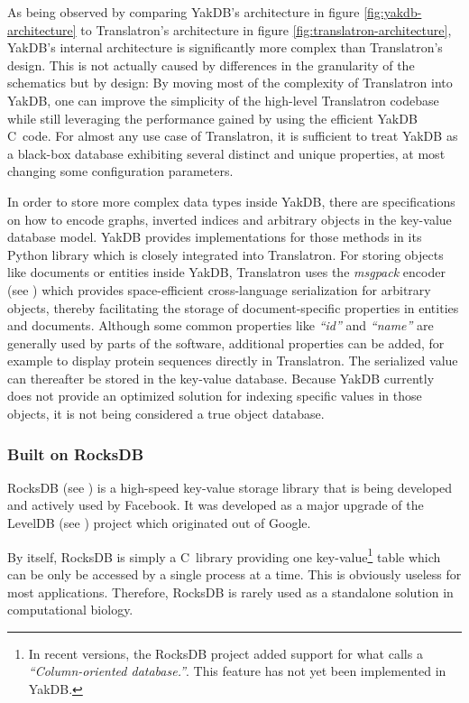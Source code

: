 \documentclass[a4paper, 12pt, twoside, reqn]{report}
\numberwithin{figure}{chapter}
\newtheorem[L]{boxedDefinition}{Definition}
\newtheorem[L]{boxedExample}{Example}
\newcommand{\itquote}[1]{\textit{{``}#1{''}}}
\def\CC{{C\nolinebreak[4]\hspace{-.05em}\raisebox{.4ex}{\tiny\bf ++}}}
\begin{document}
As being observed by comparing YakDB's architecture in figure \ref{fig:yakdb-architecture} to Translatron's architecture in figure \vref{fig:translatron-architecture}, YakDB's internal architecture is significantly more complex than Translatron's design. This is not actually caused by differences in the granularity of the schematics but by design: By moving most of the complexity of Translatron into YakDB, one can improve the simplicity of the high-level Translatron codebase while still leveraging the performance gained by using the efficient YakDB \CC\ code. For almost any use case of Translatron, it is sufficient to treat YakDB as a black-box database exhibiting several distinct and unique properties, at most changing some configuration parameters.

In order to store more complex data types inside YakDB, there are specifications on how to encode graphs, inverted indices and arbitrary objects in the key-value database model. YakDB provides implementations for those methods in its Python library which is closely integrated into Translatron. For storing objects like documents or entities inside YakDB, Translatron uses the \textit{msgpack} encoder (see \cite{furuhashi2013messagepack}) which provides space-efficient cross-language serialization for arbitrary objects, thereby facilitating the storage of document-specific properties in entities and documents. Although some common properties like \itquote{id} and \itquote{name} are generally used by parts of the software, additional properties can be added, for example to display protein sequences directly in Translatron. The serialized value can thereafter be stored in the key-value database. Because YakDB currently does not provide an optimized solution for indexing specific values in those objects, it is not being considered a true object database.

\afterpage{\clearpage}

\subsubsection{Built on RocksDB}
RocksDB (see \cite{rocksdb}) is a high-speed key-value storage library that is being developed and actively used by Facebook. It was developed as a major upgrade of the LevelDB (see \cite{LevelDB}) project which originated out of Google.
 
By itself, RocksDB is simply a \CC\ library providing one key-value\footnote{In recent versions, the RocksDB project added support for what \cite{wachinger2013next} calls a \itquote{Column-oriented database.}. This feature has not yet been implemented in YakDB.} table which can be only be accessed by a single process at a time. This is obviously useless for most applications. Therefore, RocksDB is rarely used as a standalone solution in computational biology.
 
\end{document}

